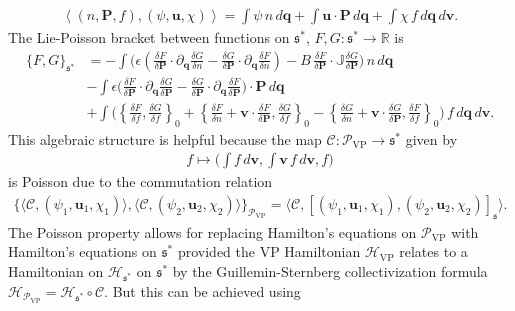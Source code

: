 \documentclass[%
 aip,
 amsmath,amssymb,
reprint, onecolumn %
]{revtex4-1}
\begin{document}
\begin{align*}
\left\langle (n,\bm{P},f),(\psi,\bm{u},\chi) \right\rangle  = \int \psi\,n\,d\bm{q} + \int \bm{u}\cdot\bm{P}\,d\bm{q} + \int \chi\,f\,d\bm{q}\,d\bm{v}.
\end{align*}
The Lie-Poisson bracket between functions on $\mathfrak{s}^*$, $F,G:\mathfrak{s}^*\rightarrow\mathbb{R}$ is
\begin{align}
\{F,G\}_{\mathfrak{s}^*} &= -\int \bigg(\epsilon\left(\frac{\delta F}{\delta\bm{P}}\cdot\partial_{\bm{q}}\frac{\delta G}{\delta n} - \frac{\delta G}{\delta\bm{P}}\cdot\partial_{\bm{q}}\frac{\delta F}{\delta n}\right) - B\,\frac{\delta F}{\delta\bm{P}}\cdot \mathbb{J}\frac{\delta G}{\delta\bm{P}}\bigg)\,n\,d\bm{q}\nonumber\\
& -\int \epsilon\bigg(\frac{\delta F}{\delta\bm{P}}\cdot\partial_{\bm{q}}\frac{\delta G}{\delta\bm{P}}-\frac{\delta G}{\delta\bm{P}}\cdot\partial_{\bm{q}}\frac{\delta F}{\delta\bm{P}}\bigg)\cdot\bm{P}\,d\bm{q}\nonumber\\
& + \int \bigg(\left\{\frac{\delta F}{\delta f},\frac{\delta G}{\delta f}\right\}_0 + \left\{\frac{\delta F}{\delta n} + \bm{v}\cdot\frac{\delta F}{\delta \bm{P}},\frac{\delta G}{\delta f}\right\}_0-\left\{\frac{\delta G}{\delta n} + \bm{v}\cdot\frac{\delta G}{\delta \bm{P}},\frac{\delta F}{\delta f}\right\}_0\bigg)\,f\,d\bm{q}\,d\bm{v}.\label{s_bracket}
\end{align}
This algebraic structure is helpful because the map $\mathcal{C}:\mathcal{P}_{\text{VP}}\rightarrow\mathfrak{s}^*$ given by
\begin{align*}
f\mapsto \bigg(\int f\,d\bm{v},\int \bm{v}\,f\,d\bm{v},f\bigg)
\end{align*}
is Poisson due to the commutation relation 
\begin{align*}
\{\langle \mathcal{C},(\psi_1,\bm{u}_1,\chi_1)\rangle,\langle \mathcal{C},(\psi_2,\bm{u}_2,\chi_2)\rangle \}_{\mathcal{P}_{\text{VP}}} = \langle \mathcal{C},[(\psi_1,\bm{u}_1,\chi_1),(\psi_2,\bm{u}_2,\chi_2)]_{\mathfrak{s}}\rangle.
\end{align*}
The Poisson property allows for replacing Hamilton's equations on $\mathcal{P}_{\text{VP}}$ with Hamilton's equations on $\mathfrak{s}^*$ provided the VP Hamiltonian $\mathcal{H}_{\text{VP}}$ relates to a Hamiltonian on $\mathcal{H}_{\mathfrak{s}^*}$ on $\mathfrak{s}^*$ by the Guillemin-Sternberg collectivization\cite{guillemin_moment_1980} formula $\mathcal{H}_{\mathcal{P}_{\text{VP}}} = \mathcal{H}_{\mathfrak{s}^*}\circ \mathcal{C}$. But this can be achieved using
\end{document}
